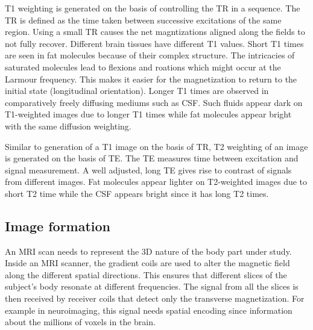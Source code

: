 \documentclass[msthesis.tex]{subfiles}
\begin{document}
T1 weighting is generated on the basis of controlling the \gls{TR} in a sequence. The \gls{TR} is defined as the time taken between successive excitations of the same region. Using a small \gls{TR} causes the net magntizations aligned along the fields to not fully recover. Different brain tissues have different T1 values. Short T1 times are seen in fat molecules because of their complex structure. The intricacies of saturated molecules lead to flexions and roations which might occur at the Larmour frequency. This makes it easier for the magnetization to return to the initial state (longitudinal orientation). Longer T1 times are observed in comparatively freely diffusing mediums such as \gls{CSF}. Such fluids appear dark on T1-weighted images due to longer T1 times while fat molecules appear bright with the same diffusion weighting.

Similar to generation of a T1 image on the basis of \gls{TR}, T2 weighting of an image is generated on the basis of \gls{TE}. The \gls{TE} measures time between excitation and signal measurement. A well adjusted, long TE gives rise to contrast of signals from different images. Fat molecules appear lighter on T2-weighted images due to short T2 time while the \gls{CSF} appears bright since it has long T2 times.


\subsection{Image formation}

An \gls{MRI} scan needs to represent the 3D nature of the body part under study. Inside an \gls{MRI} scanner, the gradient coils are used to alter the magnetic field along the different spatial directions. This ensures that different slices of the subject’s body resonate at different frequencies. The signal from all the slices is then received by receiver coils that detect only the transverse magnetization. For example in neuroimaging, this signal needs spatial encoding since information about the millions of voxels in the brain.
\end{document}
